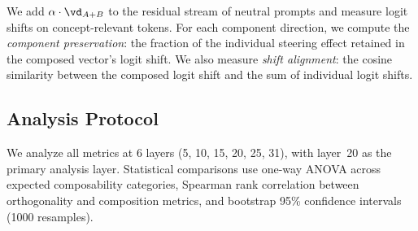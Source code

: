 We add $\alpha \cdot \dAB$ to the residual stream of neutral prompts and
measure logit shifts on concept-relevant tokens. For each component direction,
we compute the \emph{component preservation}: the fraction of the individual
steering effect retained in the composed vector's logit shift. We also measure
\emph{shift alignment}: the cosine similarity between the composed logit shift
and the sum of individual logit shifts.

\subsection{Analysis Protocol}

We analyze all metrics at 6 layers (5, 10, 15, 20, 25, 31), with layer~20 as
the primary analysis layer. Statistical comparisons use one-way ANOVA across
expected composability categories, Spearman rank correlation between
orthogonality and composition metrics, and bootstrap 95\% confidence intervals
(1000 resamples).
